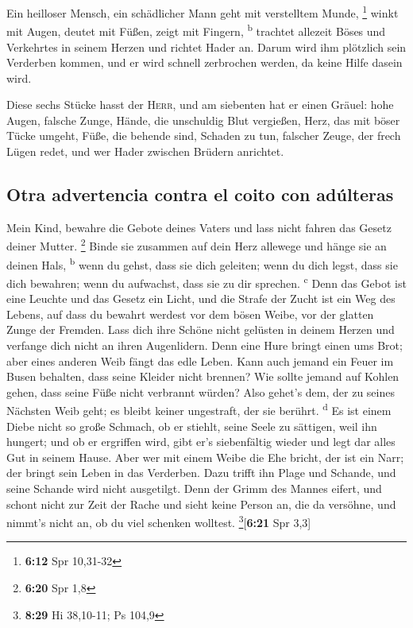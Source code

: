  Ein heilloser Mensch, ein schädlicher Mann geht mit
verstelltem Munde, \footnote{\textbf{6:12} Spr 10,31-32} 
winkt mit Augen, deutet mit Füßen, zeigt mit Fingern,
\textsuperscript{b}  trachtet allezeit Böses und
Verkehrtes in seinem Herzen und richtet Hader an.  Darum
wird ihm plötzlich sein Verderben kommen, und er wird schnell zerbrochen
werden, da keine Hilfe dasein wird.

 Diese sechs Stücke hasst der \textsc{Herr}, und am
siebenten hat er einen Gräuel:  hohe Augen, falsche
Zunge, Hände, die unschuldig Blut vergießen,  Herz, das
mit böser Tücke umgeht, Füße, die behende sind, Schaden zu tun,
 falscher Zeuge, der frech Lügen redet, und wer Hader
zwischen Brüdern anrichtet.

\hypertarget{otra-advertencia-contra-el-coito-con-aduxfalteras}{%
\subsection{Otra advertencia contra el coito con
adúlteras}\label{otra-advertencia-contra-el-coito-con-aduxfalteras}}

 Mein Kind, bewahre die Gebote deines Vaters und lass
nicht fahren das Gesetz deiner Mutter. \footnote{\textbf{6:20} Spr 1,8}
 Binde sie zusammen auf dein Herz allewege und hänge sie
an deinen Hals, \textsuperscript{b}  wenn du gehst, dass
sie dich geleiten; wenn du dich legst, dass sie dich bewahren; wenn du
aufwachst, dass sie zu dir sprechen. \textsuperscript{c} 
Denn das Gebot ist eine Leuchte und das Gesetz ein Licht, und die Strafe
der Zucht ist ein Weg des Lebens,  auf dass du bewahrt
werdest vor dem bösen Weibe, vor der glatten Zunge der Fremden.
 Lass dich ihre Schöne nicht gelüsten in deinem Herzen
und verfange dich nicht an ihren Augenlidern.  Denn eine
Hure bringt einen ums Brot; aber eines anderen Weib fängt das edle
Leben.  Kann auch jemand ein Feuer im Busen behalten,
dass seine Kleider nicht brennen?  Wie sollte jemand auf
Kohlen gehen, dass seine Füße nicht verbrannt würden? 
Also gehet's dem, der zu seines Nächsten Weib geht; es bleibt keiner
ungestraft, der sie berührt. \textsuperscript{d}  Es ist
einem Diebe nicht so große Schmach, ob er stiehlt, seine Seele zu
sättigen, weil ihn hungert;  und ob er ergriffen wird,
gibt er's siebenfältig wieder und legt dar alles Gut in seinem Hause.
 Aber wer mit einem Weibe die Ehe bricht, der ist ein
Narr; der bringt sein Leben in das Verderben.  Dazu
trifft ihn Plage und Schande, und seine Schande wird nicht ausgetilgt.
 Denn der Grimm des Mannes eifert, und schont nicht zur
Zeit der Rache  und sieht keine Person an, die da
versöhne, und nimmt's nicht an, ob du viel schenken wolltest.
\footnote{\textbf{8:29} Hi 38,10-11; Ps 104,9}{[}\textbf{6:21} Spr
3,3{]}

